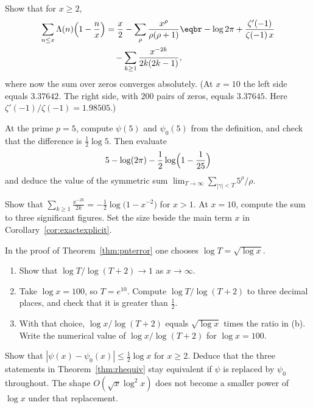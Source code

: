 \begin{exercise}[$\star\star\star$]\label{ex:cesaro}
Show that for $x\ge2$,
\[
\begin{aligned}\sum_{n\le x}\Lambda(n)\Bigl(1-\frac nx\Bigr)&=\frac x2-\sum_\rho\frac{x^\rho}{\rho(\rho+1)}\eqbr-\log2\pi+\frac{\zeta'(-1)}{\zeta(-1)\,x}\\&\quad-\sum_{k\ge1}\frac{x^{-2k}}{2k(2k-1)},\end{aligned}
\]
where now the sum over zeros converges absolutely. (At $x=10$ the left side equals $3.37642$. The right side, with $200$ pairs of zeros, equals $3.37645$. Here $\zeta'(-1)/\zeta(-1)=1.98505$.)
\end{exercise}

\begin{exercise}[$\star$]\label{ex:halfjump}
At the prime $p=5$, compute $\psi(5)$ and $\psi_0(5)$ from the definition, and check that the difference is $\frac12\log5$. Then evaluate
\[
5-\log(2\pi)-\frac12\log\Bigl(1-\frac1{25}\Bigr)
\]
and deduce the value of the symmetric sum $\lim_{T\to\infty}\sum_{|\gamma|<T}5^\rho/\rho$.
\end{exercise}

\begin{exercise}[$\star$]\label{ex:trivten}
Show that $\displaystyle\sum_{k\ge1}\frac{x^{-2k}}{2k}=-\frac12\log\bigl(1-x^{-2}\bigr)$ for $x>1$. At $x=10$, compute the sum to three significant figures. Set the size beside the main term $x$ in Corollary~\ref{cor:exactexplicit}.
\end{exercise}

\begin{exercise}[$\star\star$]\label{ex:balanceT}
In the proof of Theorem~\ref{thm:pnterror} one chooses $\log T=\sqrt{\log x}$.
\begin{enumerate}[label=(\alph*)]
\item Show that $\log T/\log(T+2)\to1$ as $x\to\infty$.
\item Take $\log x=100$, so $T=e^{10}$. Compute $\log T/\log(T+2)$ to three decimal places, and check that it is greater than $\frac12$.
\item With that choice, $\log x/\log(T+2)$ equals $\sqrt{\log x}$ times the ratio in (b). Write the numerical value of $\log x/\log(T+2)$ for $\log x=100$.
\end{enumerate}
\end{exercise}

\begin{exercise}[$\star\star$]\label{ex:psi0koch}
Show that $|\psi(x)-\psi_0(x)|\le\frac12\log x$ for $x\ge2$. Deduce that the three statements in Theorem~\ref{thm:rhequiv} stay equivalent if $\psi$ is replaced by $\psi_0$ throughout. The shape $O(\sqrt x\log^2x)$ does not become a smaller power of $\log x$ under that replacement.
\end{exercise}

